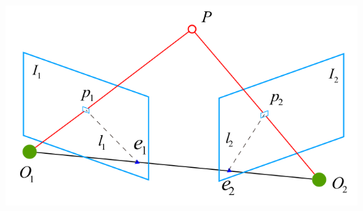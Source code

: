 \documentclass{article}
\theoremstyle{definition}
\theoremstyle{remark}
\theoremstyle{definition}
\begin{document}
\begin{center}
    \includegraphics[scale=0.35]{img/epipolar_geometry.png}
\end{center}
\end{document}
